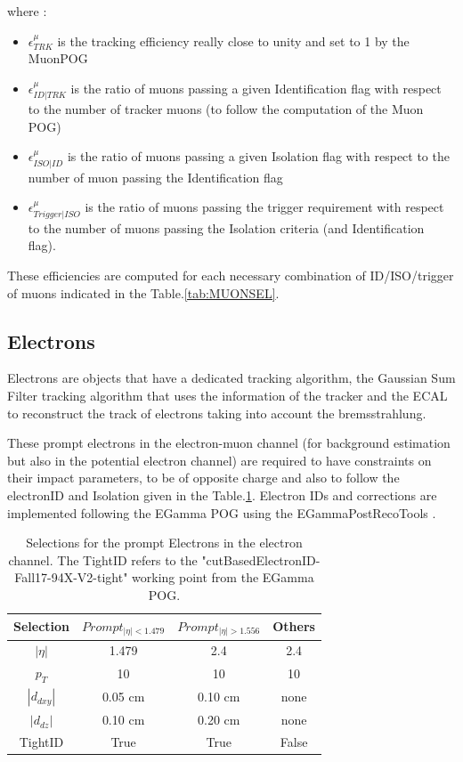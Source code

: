 \documentclass{cernatlasnote}
\begin{document}
where :
\begin{itemize}
    \item $\epsilon^{\mu}_{TRK}$ is the tracking efficiency really close to unity and set to 1 by the MuonPOG
    \item $\epsilon^{\mu}_{ID|TRK}$ is the ratio of muons passing a given Identification flag with respect to the number of tracker muons (to follow the computation of the Muon POG)
    \item $\epsilon^{\mu}_{ISO|ID}$ is the ratio of muons passing a given Isolation flag with respect to the number of muon passing the Identification flag
    \item $\epsilon^{\mu}_{Trigger|ISO}$ is the ratio of muons passing the trigger requirement with respect to the number of muons passing the Isolation criteria (and Identification flag).
\end{itemize}
These efficiencies are computed for each necessary combination \cite{MuonSpark3} of ID/ISO/trigger of muons  indicated in the Table.\ref{tab:MUONSEL}.



    \subsection{Electrons}

    Electrons are objects that have a dedicated tracking algorithm, the Gaussian Sum Filter tracking \cite{Adam_2005} algorithm that uses the information of the tracker and the ECAL to reconstruct the track of electrons taking into account the bremsstrahlung.

    These prompt electrons in the electron-muon channel (for background estimation but also in the potential electron channel) are required to have constraints on their impact parameters, to be of opposite charge and also to follow the electronID and Isolation given in the Table.\ref{tab:ELSEL}. Electron IDs and corrections are implemented following the EGamma POG using the EGammaPostRecoTools \cite{EgammaPostRecoTools}.

    \begin{table}[h]
\centering
\begin{tabular}{|c|c|c|c|}
  \hline
  \rowcolor{lightgray} 
  Selection & $Prompt_{|\eta|<1.479}$ & $Prompt_{|\eta|> 1.556}$ & Others \\
  \hline
  $|\eta|$ & 1.479 & 2.4 & 2.4 \\
  $p_T$ & 10 & 10 & 10\\
  $|d_{dxy}|$ & 0.05 cm  & 0.10 cm & none\\
  $|d_{dz}|$ & 0.10 cm & 0.20 cm & none\\
  TightID & True & True & False\\
  \hline
\end{tabular}
    \caption{Selections for the prompt Electrons in the electron channel. The TightID refers to the "cutBasedElectronID-Fall17-94X-V2-tight" working point from the EGamma POG.}
    \label{tab:ELSEL}
\end{table}
\end{document}
